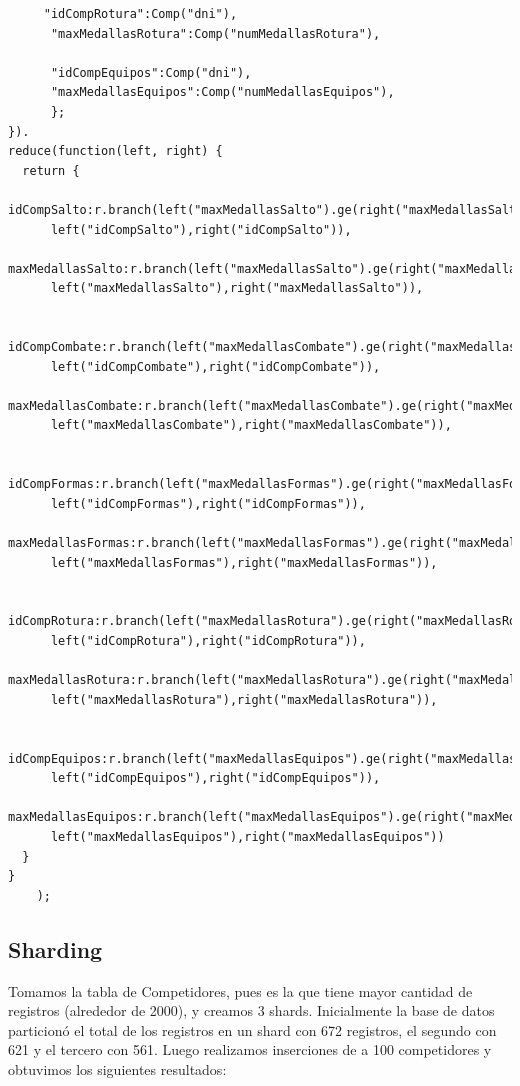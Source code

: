 \begin{itemize}
{\begin{verbatim}
     "idCompRotura":Comp("dni"),
      "maxMedallasRotura":Comp("numMedallasRotura"),
      
      "idCompEquipos":Comp("dni"),
      "maxMedallasEquipos":Comp("numMedallasEquipos"),
      };
}).
reduce(function(left, right) {
  return {
    idCompSalto:r.branch(left("maxMedallasSalto").ge(right("maxMedallasSalto")),
      left("idCompSalto"),right("idCompSalto")),
    maxMedallasSalto:r.branch(left("maxMedallasSalto").ge(right("maxMedallasSalto")),
      left("maxMedallasSalto"),right("maxMedallasSalto")),
    
    idCompCombate:r.branch(left("maxMedallasCombate").ge(right("maxMedallasCombate")),
      left("idCompCombate"),right("idCompCombate")),
    maxMedallasCombate:r.branch(left("maxMedallasCombate").ge(right("maxMedallasCombate")),
      left("maxMedallasCombate"),right("maxMedallasCombate")),
    
    idCompFormas:r.branch(left("maxMedallasFormas").ge(right("maxMedallasFormas")),
      left("idCompFormas"),right("idCompFormas")),
    maxMedallasFormas:r.branch(left("maxMedallasFormas").ge(right("maxMedallasFormas")),
      left("maxMedallasFormas"),right("maxMedallasFormas")),
    
    idCompRotura:r.branch(left("maxMedallasRotura").ge(right("maxMedallasRotura")),
      left("idCompRotura"),right("idCompRotura")),
    maxMedallasRotura:r.branch(left("maxMedallasRotura").ge(right("maxMedallasRotura")),
      left("maxMedallasRotura"),right("maxMedallasRotura")),
    
    idCompEquipos:r.branch(left("maxMedallasEquipos").ge(right("maxMedallasEquipos")),
      left("idCompEquipos"),right("idCompEquipos")),
    maxMedallasEquipos:r.branch(left("maxMedallasEquipos").ge(right("maxMedallasEquipos")),
      left("maxMedallasEquipos"),right("maxMedallasEquipos"))
  }
}
    );

\end{verbatim}
}

\end{itemize}

\subsection{Sharding}

Tomamos la tabla de Competidores, pues es la que tiene mayor cantidad de registros (alrededor de 2000), y creamos 3 shards. Inicialmente la base de datos particion\'o el total de los registros en un shard con 672 registros, el segundo con 621 y el tercero con 561. Luego realizamos inserciones de a 100 competidores y obtuvimos los siguientes resultados: \\ \\

